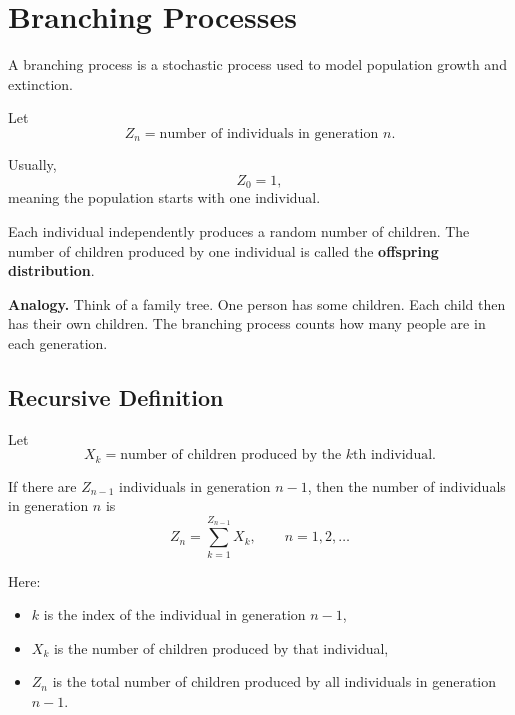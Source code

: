 \documentclass[12pt,a4paper]{article}
\theoremstyle{lecturestyle}
\begin{document}
\section{Branching Processes}

A branching process is a stochastic process used to model population growth and extinction.

Let
\[
Z_n=\text{number of individuals in generation }n.
\]

Usually,
\[
Z_0=1,
\]
meaning the population starts with one individual.

Each individual independently produces a random number of children. The number of children produced by one individual is called the \textbf{offspring distribution}.

\begin{center}
\end{center}

\textbf{Analogy.} Think of a family tree. One person has some children. Each child then has their own children. The branching process counts how many people are in each generation.

\subsection{Recursive Definition}

Let
\[
X_k=\text{number of children produced by the }k\text{th individual}.
\]

If there are $Z_{n-1}$ individuals in generation $n-1$, then the number of individuals in generation $n$ is
\[
Z_n=\sum_{k=1}^{Z_{n-1}}X_k,
\qquad n=1,2,\ldots
\]

Here:
\begin{itemize}[leftmargin=1.2cm]
    \item $k$ is the index of the individual in generation $n-1$,
    \item $X_k$ is the number of children produced by that individual,
    \item $Z_n$ is the total number of children produced by all individuals in generation $n-1$.
\end{itemize}
\end{document}
